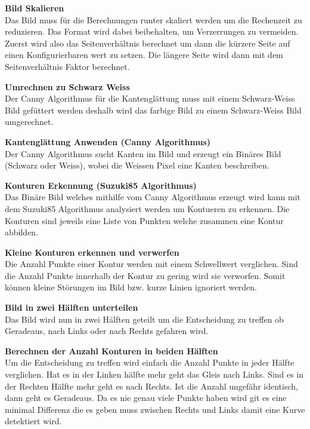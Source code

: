 \documentclass[../../main.tex]{subfiles}
\begin{document}
\textbf{Bild Skalieren}\\
Das Bild muss für die Berechnungen runter skaliert werden um die Rechenzeit zu reduzieren. Das Format
wird dabei beibehalten, um Verzerrungen zu vermeiden. Zuerst wird also das Seitenverhältnis berechnet um dann
die kürzere Seite auf einen Konfigurierbaren wert zu setzen. Die längere Seite wird dann mit dem Seitenverhältnis Faktor
berechnet.

\textbf{Umrechnen zu Schwarz Weiss}\\
Der Canny Algorithmus für die Kantenglättung muss mit einem Schwarz-Weiss Bild gefüttert werden deshalb wird das farbige Bild
zu einem Schwarz-Weiss Bild umgerechnet.

\textbf{Kantenglättung Anwenden (Canny Algorithmus)}\\
Der Canny Algorithmus sucht Kanten im Bild und erzeugt ein Binäres Bild (Schwarz oder Weiss), wobei die Weissen Pixel eine Kanten
beschreiben.

\textbf{Konturen Erkennung (Suzuki85 Algorithmus)}\\
Das Binäre Bild welches mithilfe vom Canny Algorithmus erzeugt wird kann mit dem Suzuki85 Algorithmus analysiert werden um Kontueren zu erkennen.
Die Konturen sind jeweils eine Liste von Punkten welche zusammen eine Kontur abbilden.

\textbf{Kleine Konturen erkennen und verwerfen}\\
Die Anzahl Punkte einer Kontur werden mit einem Schwellwert verglichen. Sind die Anzahl Punkte innerhalb der Kontur zu gering wird sie verworfen.
Somit können kleine Störungen im Bild bzw. kurze Linien ignoriert werden.

\textbf{Bild in zwei Hälften unterteilen}\\
Das Bild wird nun in zwei Hälften geteilt um die Entscheidung zu treffen ob Geradeaus, nach Links oder nach Rechts gefahren wird.

\textbf{Berechnen der Anzahl Konturen in beiden Hälften}\\
Um die Entscheidung zu treffen wird einfach die Anzahl Punkte in jeder Hälfte verglichen. Hat es in der Linken hälfte mehr geht das Gleis nach Links.
Sind es in der Rechten Hälfte mehr geht es nach Rechts. Ist die Anzahl ungefähr identisch, dann geht es Geradeaus. Da es nie genau viele Punkte haben wird
git es eine minimal Differenz die es geben muss zwischen Rechts und Links damit eine Kurve detektiert wird.
\end{document}
